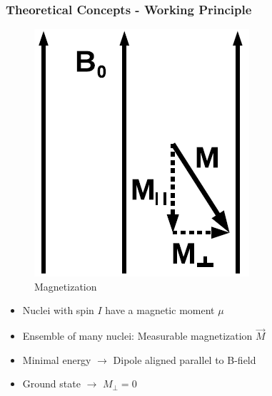 \documentclass[aspectratio=169]{beamer}
\begin{document}
\begin{frame}
	\frametitle{Theoretical Concepts - Working Principle}
	
	\begin{minipage}[t]{\textwidth}
		\begin{minipage}[t]{0.3\textwidth}
			\centering
			\begin{figure}
				\includegraphics[height=0.3\textheight]{./Resources/magnetization_components.png}
				\caption{Magnetization}
				\label{fig:mag_components}
			\end{figure}
		\end{minipage}
		\begin{minipage}[t]{0.65\textwidth}
			\begin{itemize}
				\item Nuclei with spin $I$ have a magnetic moment $\mu$
				\item Ensemble of many nuclei: Measurable magnetization $\vec{M}$
				\item Minimal energy $\rightarrow$ Dipole aligned parallel to B-field
				\vspace{10pt}
				\item Ground state $\rightarrow$ $M_{\perp} = 0$
			\end{itemize}
			\vspace*{-5pt}
			\hrulefill
		\end{minipage}
	\end{minipage}
	\pause
	\begin{minipage}[t]{\textwidth}
		\begin{minipage}[t]{0.3\textwidth}
			\centering
			\begin{figure}

\end{figure}
\end{minipage}
\end{minipage}
\end{frame}
\end{document}
